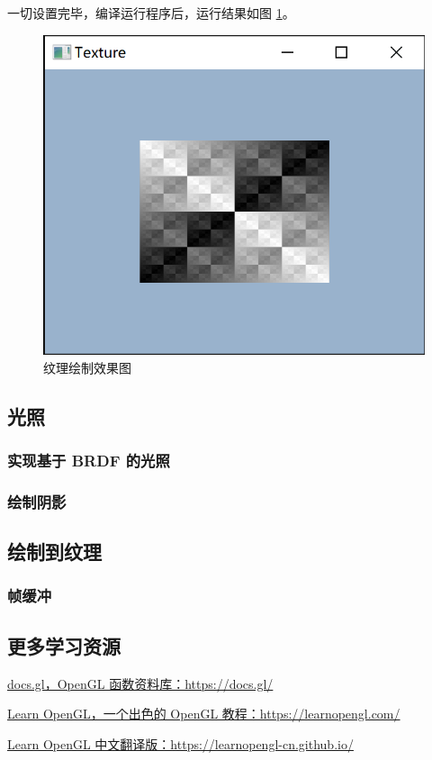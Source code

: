\documentclass[fontset=windows]{ctexart}
\begin{document}
一切设置完毕，编译运行程序后，运行结果如图 \ref{fig-gl:texture-rendered}。

\begin{figure}[htbp]
\centering
\includegraphics[width=0.5\linewidth]{imgs/sec 5.2/texture.png}
\caption{纹理绘制效果图}
\label{fig-gl:texture-rendered}
\end{figure}

\subsection{光照}

\subsubsection{实现基于 BRDF 的光照}

\subsubsection{绘制阴影}

\subsection{绘制到纹理}

\subsubsection{帧缓冲}

\subsection{更多学习资源}

\label{sec-gl:study-resources}

\href{https://docs.gl}{docs.gl，OpenGL 函数资料库：https://docs.gl/}

\href{https://learnopengl.com/}{Learn OpenGL，一个出色的 OpenGL 教程：https://learnopengl.com/}

\href{https://learnopengl-cn.github.io/}{Learn OpenGL 中文翻译版：https://learnopengl-cn.github.io/}
\end{document}

